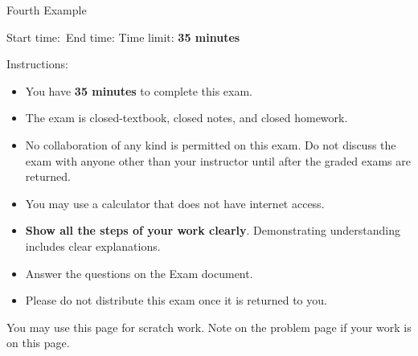 \documentclass[main.tex,14pt]{subfiles}
\begin{document}
\setcounter{page}{0}
\thispagestyle{empty}

{\Large Fourth Example}%

{Start time:\hrulefill\ End time: \hrulefill}
Time limit: \textbf{35 minutes}
\ifprintanswers
\else %

\vspace{1cm}
{\Large Instructions:}
\begin{itemize}

 \item You have \textbf{35 minutes} to complete this exam.

 \item The exam is closed-textbook, closed notes, and closed homework. 
 
 \item No collaboration of any kind is permitted on this exam. Do not discuss the exam with anyone other than your instructor until after the graded exams are returned.
 
 \item You may use a calculator that does not have internet access. 

 \item \textbf{Show all the steps of your work clearly}. Demonstrating understanding includes clear explanations.
 
\item Answer the questions on the Exam document. 


\item Please do not distribute this exam once it is returned to you.



 \end{itemize}


\afterpage{\blankpage}

\clearpage
\fi


\ifprintanswers
\else %

You may use this page for scratch work. Note on the problem page if your work is on this page.
\thispagestyle{empty}
\hbox{}


\checkoddpage{}
\fi
\end{document}
